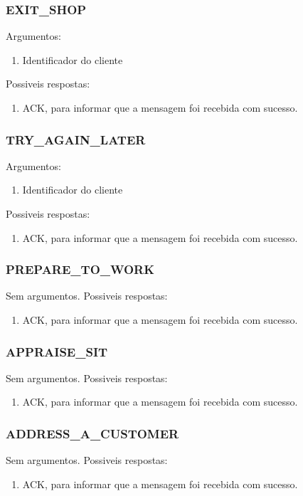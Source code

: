 \documentclass[11pt,a4paper]{report}
\begin{document}
\subsubsection{EXIT\_SHOP}
Argumentos:
\begin{enumerate}
    \itemsep-0.4em
    \item Identificador do cliente
\end{enumerate}
Possiveis respostas:
\begin{enumerate}
    \itemsep-0.4em
    \item ACK, para informar que a mensagem foi recebida com sucesso.
\end{enumerate}

\subsubsection{TRY\_AGAIN\_LATER}
Argumentos:
\begin{enumerate}
    \itemsep-0.4em
    \item Identificador do cliente
\end{enumerate}
Possiveis respostas:
\begin{enumerate}
    \itemsep-0.4em
    \item ACK, para informar que a mensagem foi recebida com sucesso.
\end{enumerate}

\subsubsection{PREPARE\_TO\_WORK}
Sem argumentos.
Possiveis respostas:
\begin{enumerate}
    \itemsep-0.4em
    \item ACK, para informar que a mensagem foi recebida com sucesso.
\end{enumerate}

\subsubsection{APPRAISE\_SIT}
Sem argumentos.
Possiveis respostas:
\begin{enumerate}
    \itemsep-0.4em
    \item ACK, para informar que a mensagem foi recebida com sucesso.
\end{enumerate}

\subsubsection{ADDRESS\_A\_CUSTOMER}
Sem argumentos.
Possiveis respostas:
\begin{enumerate}
    \itemsep-0.4em
    \item ACK, para informar que a mensagem foi recebida com sucesso.
\end{enumerate}
\end{document}

